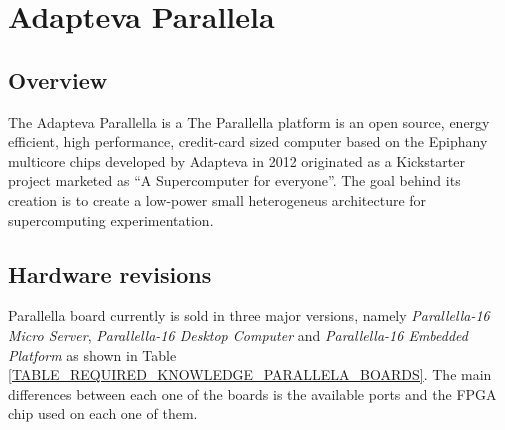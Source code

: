 \section{Adapteva Parallela} 
    \subsection{Overview}
    The Adapteva Parallella is a The Parallella platform is an open source, energy efficient, high performance, credit-card sized computer based on the 
    Epiphany multicore chips developed by Adapteva in 2012 originated as a Kickstarter project marketed as ``A Supercomputer for everyone''. The goal 
    behind its creation is to create a low-power small heterogeneus architecture for supercomputing experimentation.

    \subsection{Hardware revisions}
    Parallella board currently is sold in three major versions, namely \emph{Parallella-16 Micro Server}, \emph{Parallella-16 Desktop Computer} and 
    \emph{Parallella-16 Embedded Platform} as shown in Table \ref{TABLE_REQUIRED_KNOWLEDGE_PARALLELA_BOARDS}. The main differences between each one
    of the boards is the available ports and the FPGA chip used on each one of them.
